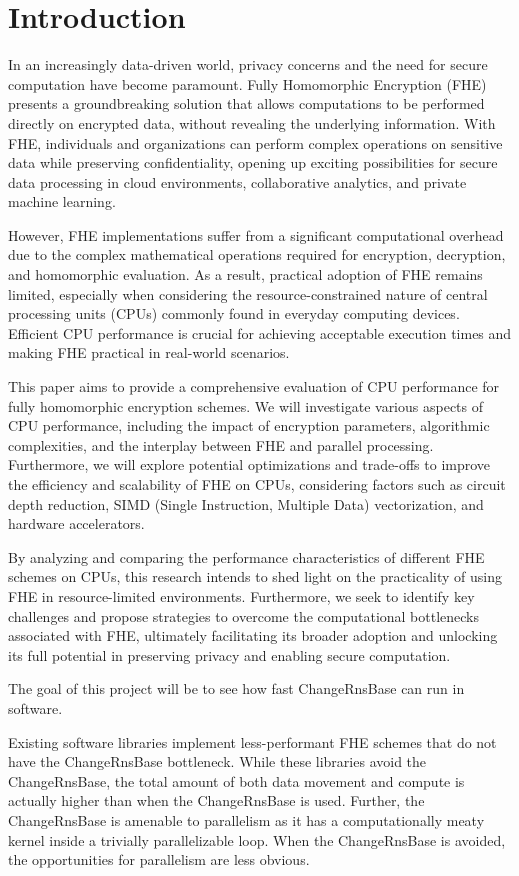 \section{Introduction}\label{sec:introduction}

\figUsecase

In an increasingly data-driven world, privacy concerns and the need for secure
computation have become paramount. Fully Homomorphic Encryption (FHE) presents
a groundbreaking solution that allows computations to be performed directly on
encrypted data, without revealing the underlying information. With FHE,
individuals and organizations can perform complex operations on sensitive data
while preserving confidentiality, opening up exciting possibilities for secure
data processing in cloud environments, collaborative analytics, and private
machine learning.

However, FHE implementations suffer from a significant computational overhead
due to the complex mathematical operations required for encryption, decryption,
and homomorphic evaluation. As a result, practical adoption of FHE remains
limited, especially when considering the resource-constrained nature of central
processing units (CPUs) commonly found in everyday computing devices. Efficient
CPU performance is crucial for achieving acceptable execution times and making
FHE practical in real-world scenarios.

This paper aims to provide a comprehensive evaluation of CPU performance for
fully homomorphic encryption schemes. We will investigate various aspects of
CPU performance, including the impact of encryption parameters, algorithmic
complexities, and the interplay between FHE and parallel processing.
Furthermore, we will explore potential optimizations and trade-offs to improve
the efficiency and scalability of FHE on CPUs, considering factors such as
circuit depth reduction, SIMD (Single Instruction, Multiple Data)
vectorization, and hardware accelerators.

By analyzing and comparing the performance characteristics of different FHE
schemes on CPUs, this research intends to shed light on the practicality of
using FHE in resource-limited environments. Furthermore, we seek to identify
key challenges and propose strategies to overcome the computational bottlenecks
associated with FHE, ultimately facilitating its broader adoption and unlocking
its full potential in preserving privacy and enabling secure computation.

The goal of this project will be to see how fast ChangeRnsBase can run in
software.

Existing software libraries implement less-performant FHE schemes that do not
have the ChangeRnsBase bottleneck.
While these libraries avoid the
ChangeRnsBase, the total amount of both data movement and compute is actually
higher than when the ChangeRnsBase is used\cite{samardzic:isca22:craterlake}.
Further, the ChangeRnsBase is amenable to parallelism as it has a
computationally meaty kernel inside a trivially parallelizable loop.
When the ChangeRnsBase is avoided, the opportunities for parallelism are less
obvious.

